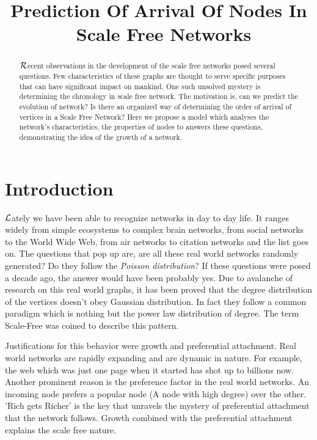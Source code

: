 \documentclass{article}
\begin{document}
\begin{center}
\title{Prediction Of Arrival Of Nodes In\\\ Scale Free Networks}
\maketitle
\end{center}
\begin{abstract}
$\cal R$ecent observations in the development of the scale free networks posed several questions. Few characteristics of these graphs are thought to serve specific purposes that can have significant impact on mankind. One such unsolved mystery is determining the chronology in scale free network. The motivation is, can we predict the evolution of network? Is there an organized way of determining the order of arrival of vertices in a Scale Free Network? Here we propose a model which analyses the network’s characteristics, the properties of nodes to answers these questions, demonstrating the idea of the growth of a network. 
\end{abstract}
\section{Introduction}
\hspace{.17in} $\cal L$ately we have been able to recognize networks in day to day life. It ranges widely from simple ecosystems to complex brain networks, from social networks to the World Wide Web, from air networks to citation networks and the list goes on. The questions that pop up are, are all these real world networks randomly generated? Do they follow the \emph{Poisson distribution}\cite{pois}? If these questions were posed a decade ago, the answer would have been probably yes. 
Due to avalanche of research on this real world graphs, it has been proved that the degree distribution of the vertices doesn't obey Gaussian distribution\cite{bara1}. In fact they follow a common paradigm which is nothing but the power law distribution of degree. The term Scale-Free was coined to describe this pattern.\cite{bara1} 

Justifications for this behavior were growth and preferential attachment. Real world networks are rapidly expanding and are dynamic in nature. For example, the web which was just one page when it started has shot up to billions now. Another prominent reason is the preference factor in the real world networks. An incoming node prefers a popular node (A node with high degree) over the other. 'Rich gets Richer' is the key that unravels the mystery of preferential attachment that the network follows. Growth combined with the preferential attachment explains the scale free nature.
\end{document}
